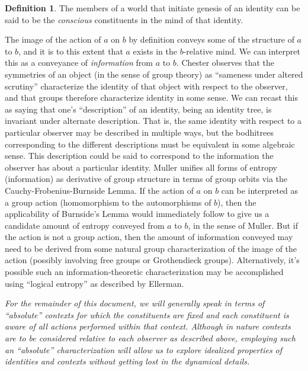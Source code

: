\documentclass[pra,twocolumn,groupedaddress,10pt]{revtex4}
\theoremstyle{definition}
\newtheorem{defn}{Definition}[section]
\begin{document}
\begin{defn}
	The members of a world that initiate genesis of an identity can be said to be the \emph{conscious} constituents in the mind of that identity.
\end{defn}

The image of the action of $a$ on $b$ by definition conveys some of the structure of $a$ to $b$, and it is to this extent that $a$ exists in the $b$-relative mind. We can interpret this as a conveyance of \textit{information} from $a$ to $b$. Chester\cite{chester} observes that the symmetries of an object (in the sense of group theory) as ``sameness under altered scrutiny'' characterize the identity of that object with respect to the observer, and that groups therefore characterize identity in some sense. We can recast this as saying that one's ``description'' of an identity, being an identity tree, is invariant under alternate description. That is, the same identity with respect to a particular observer may be described in multiple ways, but the bodhitrees corresponding to the different descriptions must be equivalent in some algebraic sense. This description could be said to correspond to the information the observer has about a particular identity. Muller\cite{muller} unifies all forms of entropy (information) as derivative of group structure in terms of group orbits via the Cauchy-Frobenius-Burnside Lemma. If the action of $a$ on $b$ can be interpreted as a group action (homomorphism to the automorphisms of $b$), then the applicability of Burnside's Lemma would immediately follow to give us a candidate amount of entropy conveyed from $a$ to $b$, in the sense of Muller. But if the action is not a group action, then the amount of information conveyed may need to be derived from some natural group characterization of the image of the action (possibly involving free groups or Grothendieck groups\cite{grogroup}). Alternatively, it's possible such an information-theoretic characterization may be accomplished using ``logical entropy'' as described by Ellerman\cite{ellerman}.

\textit{For the remainder of this document, we will generally speak in terms of ``absolute'' contexts for which the constituents are fixed and each constituent is aware of all actions performed within that context. Although in nature contexts are to be considered relative to each observer as described above, employing such an ``absolute'' characterization will allow us to explore idealized properties of identities and contexts without getting lost in the dynamical details.}
\end{document}
